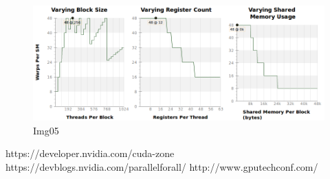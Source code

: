 \documentclass[a4paper]{article}
\begin{document}
\begin{figure}[!ht]
    \centering
    \includegraphics[width=0.7\linewidth]{profiling/darker/darker_varying}
    \caption{Img05}
    \label{fig:img05Prof}
\end{figure}
\FloatBarrier

\printbibliography 

https://developer.nvidia.com/cuda-zone
https://devblogs.nvidia.com/parallelforall/
http://www.gputechconf.com/
\end{document}

